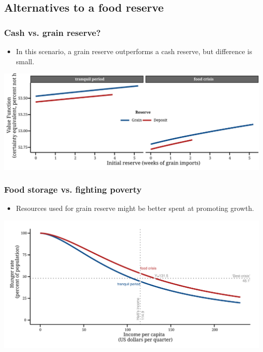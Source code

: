 \documentclass[svgnames]{beamer}
\begin{document}
\subsection{Alternatives to a food reserve}
\begin{frame}
\frametitle{Cash vs. grain reserve?}
\begin{itemize}
\item \small{In this scenario, a grain reserve outperforms a cash reserve, but difference is small.}
\end{itemize}
\vspace{1em}
\centering
\includegraphics[width=\textwidth]{Value-function-facet-baseline}
\end{frame}


\begin{frame}
\frametitle{Food storage vs. fighting poverty}
\begin{itemize}
\item \small{Resources used for grain reserve might be better spent at promoting growth.}
\end{itemize}
\vspace{1em}
\centering
\includegraphics[width=\textwidth]{fig-Effect-Income}
\end{frame}
\end{document}
